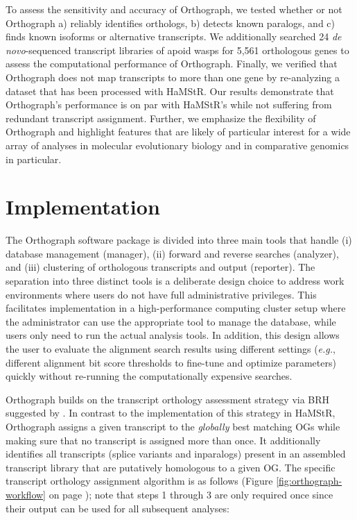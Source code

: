 To assess the sensitivity and accuracy of Orthograph, we tested whether
or not Orthograph a) reliably identifies orthologs, b) detects known
paralogs, and c) finds known isoforms or alternative transcripts. We
additionally searched 24 \emph{de novo}-sequenced transcript libraries
of apoid wasps for 5,561 orthologous genes to assess the computational
performance of Orthograph. Finally, we verified that Orthograph does not
map transcripts to more than one gene by re-analyzing a dataset that has
been processed with HaMStR. Our results demonstrate that Orthograph's
performance is on par with HaMStR's while not suffering from redundant
transcript assignment. Further, we emphasize the flexibility of
Orthograph and highlight features that are likely of particular interest
for a wide array of analyses in molecular evolutionary biology and in
	comparative genomics in particular.

\section{Implementation}\label{implementation}

The Orthograph software package is divided into three main tools that
handle (i) database management (manager), (ii) forward and reverse
searches (analyzer), and (iii) clustering of orthologous transcripts and
output (reporter). The separation into three distinct tools is a
deliberate design choice to address work environments where users do not
have full administrative privileges. This facilitates implementation in
a high-performance computing cluster setup where the administrator can
use the appropriate tool to manage the database, while users only need
to run the actual analysis tools. In addition, this design allows the
user to evaluate the alignment search results using different settings
(\emph{e.g.}, different alignment bit score thresholds to fine-tune and
optimize parameters) quickly without re-running the computationally
expensive searches.

Orthograph builds on the transcript orthology assessment strategy via
BRH suggested by \cite{Ebersberger2009}. In contrast to the
implementation of this strategy in HaMStR, Orthograph assigns a given
transcript to the \emph{globally} best matching OGs while making sure
that no transcript is assigned more than once. It additionally
identifies all transcripts (splice variants and inparalogs) present in
an assembled transcript library that are putatively homologous to a
given OG. The specific transcript orthology assignment algorithm is as
follows (Figure \ref{fig:orthograph-workflow} on page
\pageref{fig:orthograph-workflow}); note that steps 1 through 3 are only
required once since their output can be used for all subsequent
analyses:


